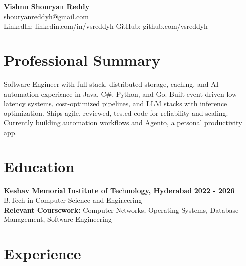 \documentclass[a4paper,11pt]{article}
\newcommand{\resumeSubheading}[4]{%
  \textbf{#1} \hfill \textbf{#2} \\
{#3} \hfill {#4}
}
\begin{document}
\pagestyle{empty}
\raggedbottom
\addtolength{\textheight}{2\baselineskip}
\small

\begin{center}
  {\LARGE \textbf{Vishnu Shouryan Reddy}}\\[0.3em]
  shouryanreddyh@gmail.com \\[0.3em]
  LinkedIn: linkedin.com/in/vsreddyh \textbar{} GitHub: github.com/vsreddyh
\end{center}
\vspace{-0.8em}

\section*{Professional Summary}

Software Engineer with full-stack, distributed storage, caching, and AI automation experience in Java, C\#, Python, and Go. Built event-driven low-latency systems, cost-optimized pipelines, and LLM stacks with inference optimization. Ships agile, reviewed, tested code for reliability and scaling. Currently building automation workflows and Agento, a personal productivity app.

\section*{Education}

\resumeSubheading
{Keshav Memorial Institute of Technology, Hyderabad}{2022 - 2026}
{B.Tech in Computer Science and Engineering}{} \\
\textbf{Relevant Coursework:} Computer Networks, Operating Systems, Database Management, Software Engineering


\section*{Experience}
\end{document}
